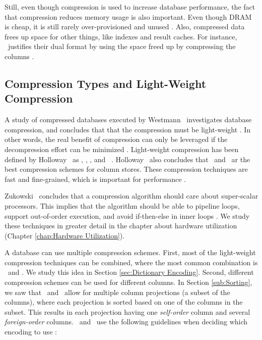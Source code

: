 Still, even though compression is used to increase database performance, the fact that compression reduces memory usage is also important. Even though DRAM is cheap, it is still rarely over-provisioned and unused \cite{Barber2014-ey}. Also, compressed data frees up space for other things, like indexes and result caches. For instance, \oracle~justifies their dual format by using the space freed up by compressing the columns \cite{Lamb2012-kg, Lahiri2015-mz}.

\subsection{Compression Types and Light-Weight Compression}
\label{sub:Compression Types and Light-Weight Compression}
A study of compressed databases executed by Westmann \ea~investigates database compression, and concludes that that the compression must be light-weight \cite{Westmann2000-mz}. In other words, the real benefit of compression can only be leveraged if the decompression effort can be minimized \cite{Lemke2010-is}. Light-weight compression has been defined by Holloway \ea~as \bp, \de, \dele, and \rle~\cite{Holloway2008-rr}. Holloway \ea~also concludes that \de~and \rle~ar the best compression schemes for column stores. These compression techniques are fast and fine-grained, which is important for performance \cite{Lemke2010-is}.

Zukowski \ea~concludes that a compression algorithm should care about super-scalar processors. This implies that the algorithm should be able to pipeline loops, support out-of-order execution, and avoid if-then-else in inner loops \cite{Zukowski2006-oz}. We study these techniques in greater detail in the chapter about hardware utilization (Chapter \ref{chap:Hardware Utilization}). 

A database can use multiple compression schemes. First, most of the light-weight compression techniques can be combined, where the most common combination is \de~and \bp. We study this idea in Section \ref{sec:Dictionary Encoding}. Second, different compression schemes can be used for different columns. In Section \ref{sub:Sorting}, we saw that \cstore~and \vertica~allow for multiple column projections (a subset of the columns), where each projection is sorted based on one of the columns in the subset. This results in each projection having one \textit{self-order} column and several \textit{foreign-order} columns.  \cstore~and \vertica~use the following guidelines when deciding which encoding to use \cite{Stonebraker2005-qz}: 

